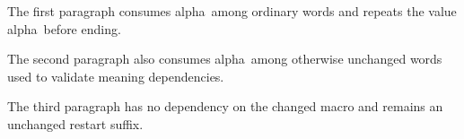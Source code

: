 
\hsize=220pt \vsize=240pt
\def\variant{alpha}
The first paragraph consumes \variant\ among ordinary words and repeats the value \variant\ before ending.

The second paragraph also consumes \variant\ among otherwise unchanged words used to validate meaning dependencies.

The third paragraph has no dependency on the changed macro and remains an unchanged restart suffix.
\bye
